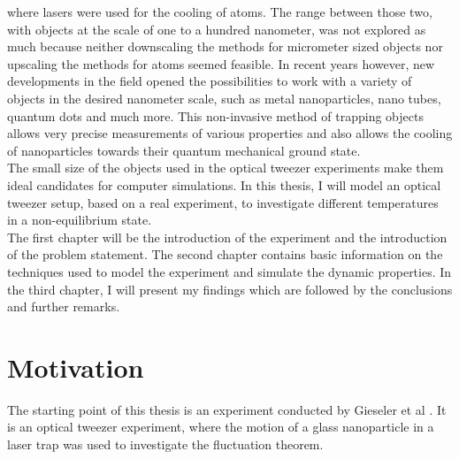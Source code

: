 \documentclass[12pt]{article}
\begin{document}
where lasers were used for the cooling of atoms. The range between those two, with objects at the scale of one to a hundred nanometer, was not
explored as much because neither downscaling the methods for micrometer sized objects nor upscaling the methods for atoms seemed feasible. In recent
years however, new developments in the field opened the possibilities to work with a variety of objects in the desired nanometer scale, such as metal
nanoparticles, nano tubes, quantum dots and much more. This non-invasive method of trapping objects allows very precise measurements of various
properties and also allows the cooling of nanoparticles towards their quantum mechanical ground state.\\
The small size of the objects used in the optical tweezer experiments make them ideal candidates for computer simulations. In this thesis, I will
model an optical tweezer setup, based on a real experiment, to investigate different temperatures in a non-equilibrium state.\\
The first chapter will be the introduction of the experiment and the introduction of the problem statement. The second chapter contains basic
information on the techniques used to model the experiment and simulate the dynamic properties. In the third chapter, I will present my findings which
are followed by the conclusions and further remarks.







\newpage
\section{Motivation}
The starting point of this thesis is an experiment conducted by Gieseler et al \cite{Gieseler2014}. It is an optical tweezer experiment, where the
motion of a glass nanoparticle in a laser trap was used to investigate the fluctuation theorem\cite{Crooks1999}.
\end{document}
